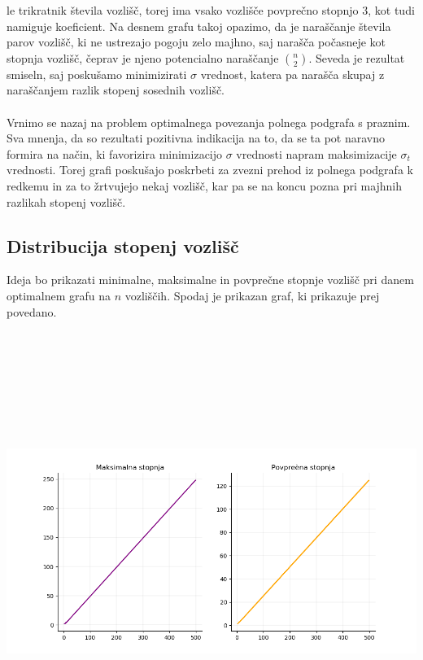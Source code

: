 \documentclass[ letterpaper, titlepage, fleqn]{article}
\begin{document}
le trikratnik števila vozlišč, torej ima vsako vozlišče povprečno stopnjo $3$, kot tudi namiguje koeficient.
Na desnem grafu takoj opazimo, da je naraščanje števila parov vozlišč, ki ne ustrezajo pogoju
zelo majhno, saj narašča počasneje kot stopnja vozlišč, čeprav je njeno potencialno naraščanje
$\binom{n}{2}$. 
Seveda je rezultat smiseln, saj poskušamo minimizirati $\sigma$ vrednost, katera pa narašča
skupaj z naraščanjem razlik stopenj sosednih vozlišč. 
\\\\
Vrnimo se nazaj na problem optimalnega povezanja polnega podgrafa s praznim. 
Sva mnenja, da so rezultati pozitivna indikacija na to, da se ta pot naravno formira na način, 
ki favorizira minimizacijo $\sigma$ vrednosti napram maksimizacije $\sigma_t$ vrednosti.
Torej grafi poskušajo poskrbeti za zvezni prehod iz polnega podgrafa k redkemu in za to 
žrtvujejo nekaj vozlišč, kar pa se na koncu pozna pri majhnih razlikah stopenj vozlišč.

\subsection{Distribucija stopenj vozlišč}
Ideja bo prikazati minimalne, maksimalne in povprečne stopnje vozlišč pri danem optimalnem grafu na $n$ vozliščih.
Spodaj je prikazan graf, ki prikazuje prej povedano. \\
\includegraphics[width=\textwidth, height=15cm]{graphics/degree_distribution.png}\\
\end{document}
